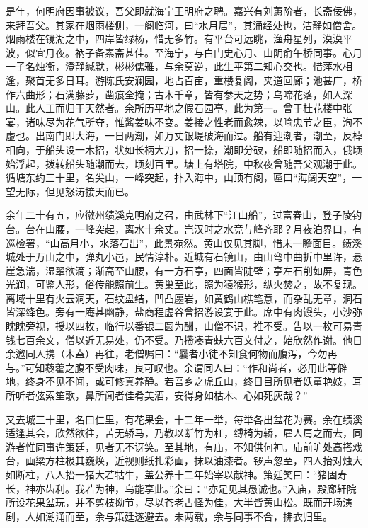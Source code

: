 \documentclass[]{article}
\begin{document}
是年，何明府因事被议，吾父即就海宁王明府之聘。嘉兴有刘蕙阶者，长斋佞佛，来拜吾父。其家在烟雨楼侧，一阁临河，曰``水月居''，其涌经处也，洁静如僧舍。烟雨楼在镜湖之中，四岸皆绿杨，惜无多竹。有平台可远眺，渔舟星列，漠漠平波，似宜月夜。衲子备素斋甚佳。至海宁，与白门史心月、山阴俞午桥同事。心月一子名烛衡，澄静缄默，彬彬儒雅，与余莫逆，此生平第二知心交也。惜萍水相逢，聚首无多日耳。游陈氏安澜园，地占百亩，重楼复阁，夹道回廊；池甚广，桥作六曲形；石满藤萝，凿痕全掩；古木千章，皆有参天之势；鸟啼花落，如人深山。此人工而归于天然者。余所历平地之假石园亭，此为第一。曾于桂花楼中张宴，诸味尽为花气所夺，惟酱姜味不变。姜接之性老而愈辣，以喻忠节之臣，洵不虚也。出南门即大海，一日两潮，如万丈银堤破海而过。船有迎潮者，潮至，反棹相向，于船头设一木招，状如长柄大刀，招一捺，潮即分破，船即随招而入，俄顷始浮起，拨转船头随潮而去，顷刻百里。塘上有塔院，中秋夜曾随吾父观潮于此。循塘东约三十里，名尖山，一峰突起，扑入海中，山顶有阁，匾曰``海阔天空''，一望无际，但见怒涛接天而已。

余年二十有五，应徽州绩溪克明府之召，由武林下``江山船''，过富春山，登子陵钓台。台在山腰，一峰突起，离水十余丈。岂汉时之水竞与峰齐耶？月夜泊界口，有巡检署，``山高月小，水落石出''，此景宛然。黄山仅见其脚，惜未一瞻面目。绩溪城处于万山之中，弹丸小邑，民情淳朴。近城有石镜山，由山弯中曲折中里许，悬崖急湍，湿翠欲滴；渐高至山腰，有一方石亭，四面皆陡壁；亭左石削如屏，青色光润，可鉴人形，俗传能照前生。黄巢至此，照为猿猴形，纵火焚之，故不复现。离域十里有火云洞天，石纹盘结，凹凸廛岩，如黄鹤山樵笔意，而杂乱无章，洞石皆深绛色。旁有一庵甚幽静，盐商程虚谷曾招游设宴于此。席中有肉馒头，小沙弥眈眈旁视，授以四枚，临行以番银二圆为酬，山僧不识，推不受。告以一枚可易青钱七百余文，僧以近无易处，仍不受。乃攒凑青蚨六百文付之，始欣然作谢。他日余邀同人携（木盍）再往，老僧嘱曰：``曩者小徒不知食何物而腹泻，今勿再与。''可知藜藿之腹不受肉味，良可叹也。余谓同人曰：``作和尚者，必用此等僻地，终身不见不闻，或可修真养静。若吾乡之虎丘山，终日目所见者妖童艳妓，耳所听者弦索笙歌，鼻所闻者佳肴美酒，安得身如枯木、心如死灰哉？''

又去城三十里，名曰仁里，有花果会，十二年一举，每举各出盆花为赛。余在绩溪适逢其会，欣然欲往，苦无轿马，乃教以断竹为杠，缚椅为轿，雇人肩之而去，同游者惟同事许策廷，见者无不讶笑。至其地，有庙，不知供何神。庙前旷处高搭戏台，画梁方柱极其巍焕，近视则纸扎彩画，抹以油漆者。锣声忽至，四人抬对烛大如断柱，八人抬一猪大若牯牛，盖公养十二年始宰以献神。策廷笑曰：``猪固寿长，神亦齿利。我若为神，乌能享此。''余曰：``亦足见其愚诚也。''入庙，殿廊轩院所设花果盆玩，并不剪枝拗节，尽以苍老古怪为佳，大半皆黄山松。既而开场演剧，人如潮涌而至，余与策廷遂避去。未两载，余与同事不合，拂衣归里。
\end{document}
